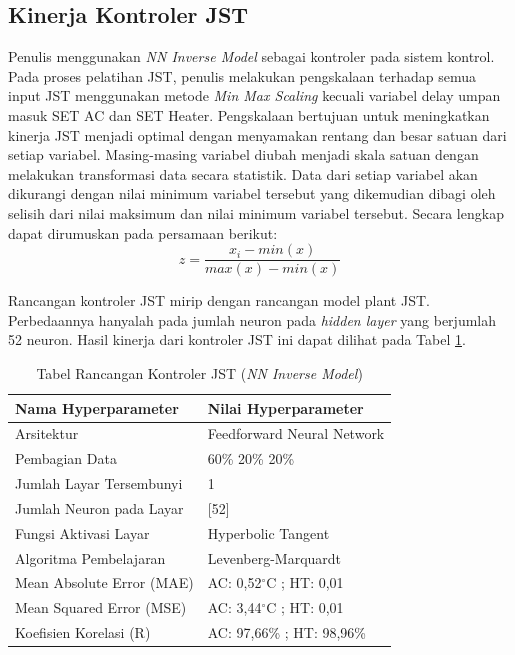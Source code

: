 \subsection{Kinerja Kontroler JST}

Penulis menggunakan \textit{NN Inverse Model} sebagai kontroler pada sistem kontrol. Pada proses pelatihan JST, penulis melakukan pengskalaan terhadap semua input JST menggunakan metode \textit{Min Max Scaling} kecuali variabel delay umpan masuk SET AC dan SET Heater. Pengskalaan bertujuan untuk meningkatkan kinerja JST menjadi optimal dengan menyamakan rentang dan besar satuan dari setiap variabel. Masing-masing variabel diubah menjadi skala satuan dengan melakukan transformasi data secara statistik. Data dari setiap variabel akan dikurangi dengan nilai minimum variabel tersebut yang dikemudian dibagi oleh selisih dari nilai maksimum dan nilai minimum variabel tersebut. Secara lengkap dapat dirumuskan pada persamaan berikut:
\begin{equation} \label{eq:5:MinMaxScaler}
z = \frac{x_i - min(x)}{max(x) - min(x)}
\end{equation}

Rancangan kontroler JST mirip dengan rancangan model plant JST. Perbedaannya hanyalah pada jumlah neuron pada \textit{hidden layer} yang berjumlah 52 neuron. Hasil kinerja dari kontroler JST ini dapat dilihat pada Tabel \ref{tbl:5:NNControler}.\\

\begin{table}[!h]
	\caption{Tabel Rancangan Kontroler JST (\textit{NN Inverse Model})}
	\label{tbl:5:NNControler}
	\centering
	\begin{tabular}{|p{5.7cm}|p{5cm}|}
		\hline
		\textbf{Nama Hyperparameter} & \textbf{Nilai Hyperparameter} \\ \hline
		Arsitektur & Feedforward Neural Network \\ \hline
		Pembagian Data & 60\% 20\% 20\% \\ \hline 
		Jumlah Layar Tersembunyi & 1 \\ \hline
		Jumlah Neuron pada Layar & [52] \\ \hline
		Fungsi Aktivasi Layar & Hyperbolic Tangent \\ \hline
		Algoritma Pembelajaran & Levenberg-Marquardt \\ \hline
		Mean Absolute Error (MAE) & AC: 0,52$^\circ$C ; HT: 0,01 \\ \hline
		Mean Squared Error (MSE) & AC: 3,44$^\circ$C ; HT: 0,01 \\ \hline
		Koefisien Korelasi (R) & AC: 97,66\% ; HT: 98,96\% \\ \hline
	\end{tabular}
\end{table}
\vspace{8em}

